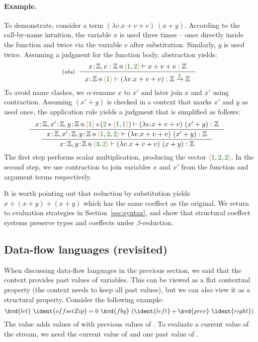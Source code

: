 \paragraph{Example.} To demonstrate, consider a term
$(\lambda v.x+v+v)~(x+y)$. According to the call-by-name intuition, the variable $x$ is used three 
times -- once directly inside the function and twice via the variable $v$ after 
substitution. Similarly, $y$ is used 
twice. Assuming a judgment for the function body, abstraction yields:
%
\begin{equation*}
\tyrule{abs}
 { \coctx{x\!:\!\mathbb{Z},v:\mathbb{Z}}{\alift{\cclrd{1},\cclrd{2}}} \vdash x+v+v : \mathbb{Z} }
 { \coctx{x\!:\!\mathbb{Z}}{\alift{\cclrd{1}}} \vdash (\lambda v.x+v+v) : \mathbb{Z} \xrightarrow{\cclrd{2}} \mathbb{Z} }
\end{equation*}
%
To avoid name clashes, we $\alpha$-rename $x$ to $x'$ and later join $x$ and $x'$ using contraction.
Assuming $(x'+y)$ is checked in a context that marks $x'$ and $y$ as used once, the application rule yields
a judgment that is simplified as follows:
\[
\hspace{-0.7em}\inference
  { \coctx{x\!:\!\mathbb{Z},x'\!:\!\mathbb{Z},y\!:\!\mathbb{Z}}
          {\alift{\cclrd{1}} \cons (\cclrd{2} \ast \alift{\cclrd{1},\cclrd{1}}) } \vdash (\lambda v.x+v+v)~(x'+y) : \mathbb{Z} }
{\inference
  { \coctx{x\!:\!\mathbb{Z},x'\!:\!\mathbb{Z},y\!:\!\mathbb{Z}}{\alift{\cclrd{1}, \cclrd{2}, \cclrd{2}} } \vdash (\lambda v.x+v+v)~(x'+y) : \mathbb{Z} }
  { \coctx{x\!:\!\mathbb{Z},y\!:\!\mathbb{Z}}{\alift{\cclrd{3}, \cclrd{2}}} \vdash (\lambda v.x+v+v)~(x+y)  : \mathbb{Z}} }
\]
%
The first step performs scalar multiplication, producing the vector
$\alift{\cclrd{1},\cclrd{2},\cclrd{2}}$. In the second step, we use contraction to join variables 
$x$ and $x'$ from the function and argument terms respectively.

It is worth pointing out that reduction by substitution yields $x+(x+y)+(x+y)$ which has the same coeffect as
the original. We return to evaluation strategies in Section~\ref{sec:syntax}, and 
show that structural coeffect systems preserve types and coeffects under $\beta$-reduction. 


\subsection{Data-flow languages (revisited)}
When discussing data-flow languages in the previous section, we said that the context provides 
past values of variables. This can be viewed as a flat contextual property (the context needs
to keep all past values), but we can also view it as a structural property. Consider the following
example:
%
\begin{equation*}
\kvd{let}~\ident{offsetZip} = 0~\kvd{fby}~(\ident{left} + \kvd{prev}~\ident{right})
\end{equation*}
%
The value  adds values of  with previous values of .
To evaluate a current value of the stream, we need the current value of  and one past
value of . 

